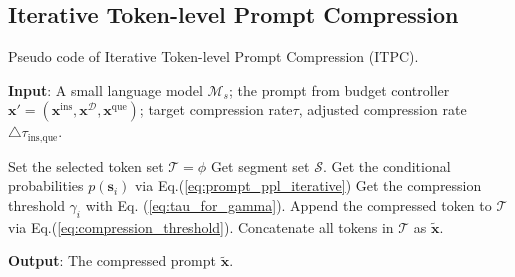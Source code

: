 \subsection{Iterative Token-level Prompt Compression}
\begin{algorithm}[t]
    \small
	\caption{Pseudo code of Iterative Token-level Prompt Compression (ITPC).} 
    \textbf{Input}: A small language model $\mathcal{M}_{s}$; the prompt from budget controller $\bm{x}'= (\bm{x}^{\text{ins}}, \bm{x}^{\mathcal{D}}, \bm{x}^{\text{que}})$; target compression rate$\tau$, adjusted compression rate $\triangle\tau_{\text{ins}, \text{que}}$.
	\begin{algorithmic}[1]
        \State Set the selected token set $\mathcal{T}=\phi$ 
        \State Get segment set $\mathcal{S}$. %
        \State Get the conditional probabilities $p(\bm{s}_i)$ via Eq.(\ref{eq:prompt_ppl_iterative})
        \State Get the compression threshold $\gamma_i$ with Eq. (\ref{eq:tau_for_gamma}).
        \State Append the compressed token to $\mathcal{T}$ via Eq.(\ref{eq:compression_threshold}).
        \EndFor
        \State Concatenate all tokens in $\mathcal{T}$ as $\bm{\widetilde{x}}$.
	\end{algorithmic} 
    \textbf{Output}: The compressed prompt $\bm{\widetilde{x}}$.
    \label{alg:iterative_prompt_compression}
\end{algorithm}


